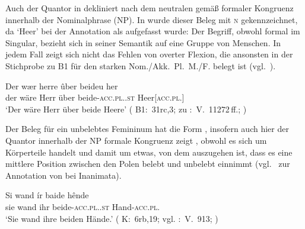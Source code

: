 \begin{exe}
\end{exe}

Auch der Quantor in  dekliniert nach dem neutralen
 gemäß formaler Kongruenz innerhalb der
Nominalphrase (NP). In  wurde dieser
Beleg mit \textsc{n\subA} gekennzeichnet, da  `Heer' bei der
Annotation als  \autocite[211--213]{corbett2006} aufgefasst
wurde: Der Begriff, obwohl formal im Singular, bezieht sich in seiner Semantik
auf eine Gruppe von Menschen. In jedem Fall zeigt sich nicht das Fehlen von
overter Flexion, die ansonsten in der Stichprobe zu B1 für den starken
Nom./Akk.~Pl.~M./F. belegt ist (vgl.~).

\begin{exe}
\ex \label{ex:beideuher}
	\gll Der wær herre ûber beideu her \\
		der wäre Herr über beide-\textsc{acc.pl.\NeutA.st} Heer[\textsc{acc.pl.\NeutA}] \\
	\trans `Der wäre Herr über beide Heere'
		(%
			B1:~31rc,3; zu
			\KC:~V.~11272\,ff.;
			\cite[287]{schroeder1895}%
		)
\end{exe}

Der Beleg für ein unbelebtes Femininum hat die Form ,
insofern auch hier der Quantor innerhalb der NP formale
Kongruenz zeigt , obwohl es sich um
Körperteile handelt und damit um etwas, von dem auszugehen ist,
dass es eine mittlere Position zwischen den Polen belebt und
unbelebt einnimmt (vgl.~ zur Annotation von
 bei Inanimata).

\begin{exe}
	\ex \gll Si wand ír baide hênde \\
			sie wand ihr beide-\textsc{acc.pl.\FemI.st} Hand-\textsc{acc.pl.\FemI} \\
		\trans `Sie wand ihre beiden Hände.'
			(%
				K:~6rb,19; vgl.
				\KC:~V.~913;
				\cite[98]{schroeder1895}%
			)
		\label{ex:uozehende_2}
\end{exe}

